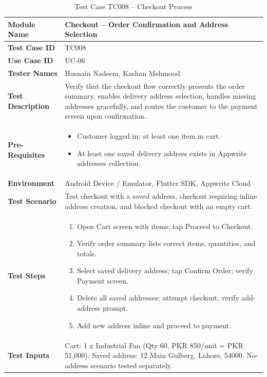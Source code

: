\begin{table}[H]
\centering
\caption{Test Case TC008 -- Checkout Process}
\label{tab:tc008}
\renewcommand{\arraystretch}{1.15}
\small
\begin{tabular}{|p{3.2cm}|p{10.8cm}|}
\hline
\textbf{Module Name} & Checkout -- Order Confirmation and Address Selection \\ \hline
\textbf{Test Case ID} & TC008 \\ \hline
\textbf{Use Case ID} & UC-06 \\ \hline
\textbf{Tester Names} & Husnain Nadeem, Kashan Mehmood \\ \hline
\textbf{Test Description} & Verify that the checkout flow correctly presents the order summary, enables delivery address selection, handles missing addresses gracefully, and routes the customer to the payment screen upon confirmation. \\ \hline
\textbf{Pre-Requisites} &
\begin{itemize}[leftmargin=*,noitemsep]
\item Customer logged in; at least one item in cart.
\item At least one saved delivery address exists in Appwrite addresses collection.
\end{itemize} \\ \hline
\textbf{Environment} & Android Device / Emulator, Flutter SDK, Appwrite Cloud \\ \hline
\textbf{Test Scenario} & Test checkout with a saved address, checkout requiring inline address creation, and blocked checkout with an empty cart. \\ \hline
\textbf{Test Steps} &
\begin{enumerate}[leftmargin=*,noitemsep]
\item Open Cart screen with items; tap Proceed to Checkout.
\item Verify order summary lists correct items, quantities, and totals.
\item Select saved delivery address; tap Confirm Order; verify Payment screen.
\item Delete all saved addresses; attempt checkout; verify add-address prompt.
\item Add new address inline and proceed to payment.
\end{enumerate} \\ \hline
\textbf{Test Inputs} & Cart: 1 x Industrial Fan (Qty 60, PKR 850/unit = PKR 51,000). Saved address: 12 Main Gulberg, Lahore, 54000. No-address scenario tested separately. \\ \hline

\end{tabular}
\end{table}
